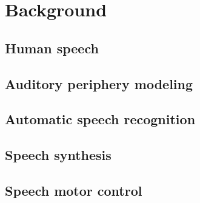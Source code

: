 \chapter{Background}

\section{Human speech}

\section{Auditory periphery modeling}

\section{Automatic speech recognition}

\section{Speech synthesis}

\section{Speech motor control}
